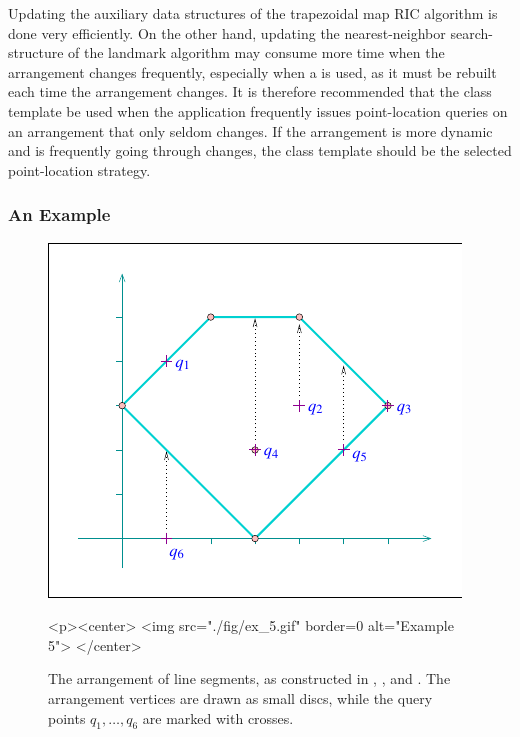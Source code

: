 Updating the auxiliary data structures of the trapezoidal map RIC
algorithm is done very efficiently. On the other hand, updating the
nearest-neighbor search-structure of the landmark algorithm may consume
more time when the arrangement changes frequently, especially when
a \kdtree{} is used, as it must be rebuilt each time the arrangement
changes. It is therefore recommended that the
 class template be used when the
application frequently issues point-location queries on an arrangement
that only seldom changes. If the arrangement is more dynamic and is
frequently going through changes, the 
class template should be the selected point-location strategy.

\subsubsection{An Example\label{arr_sssec:pl_ex}}
\begin{figure}[t]
\begin{ccTexOnly}
  \begin{center}
  \includegraphics{Arrangement_on_surface_2/fig/ex_5}
  \end{center}
\end{ccTexOnly}
\begin{ccHtmlOnly}
  <p><center>
  <img src="./fig/ex_5.gif" border=0 alt="Example 5">
  </center>
\end{ccHtmlOnly}
\caption{The arrangement of line segments, as constructed in
, , and
. The
arrangement vertices are drawn as small discs, while the query
points $q_1, \ldots, q_6$ are marked with crosses.\label{arr_fig:ex_5}}
\end{figure}

